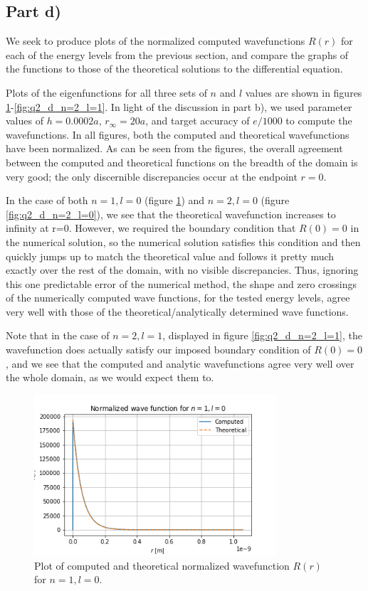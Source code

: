 \documentclass{article}
\begin{document}
\subsection{Part d)}

We seek to produce plots of the normalized computed wavefunctions $R(r)$ for each of the energy levels from the previous section, and compare the graphs of the functions to those of the theoretical solutions to the differential equation.

Plots of the eigenfunctions for all three sets of $n$ and $l$ values are shown in figures \ref{fig:q2_d_n=1_l=0}-\ref{fig:q2_d_n=2_l=1}. In light of the discussion in part b), we used parameter values of $h=0.0002a$, $r_\infty=20a$, and target accuracy of  $e/1000$ to compute the wavefunctions. In all figures, both the computed and theoretical wavefunctions have been normalized. As can be seen from the figures, the overall agreement between the computed and theoretical functions on the breadth of the domain is very good; the only discernible discrepancies occur at the endpoint $r=0$.

In the case of both $n=1, l=0$ (figure \ref{fig:q2_d_n=1_l=0}) and $n=2, l=0$ (figure \ref{fig:q2_d_n=2_l=0}), we see that the theoretical wavefunction increases to infinity at r=0. However, we required the boundary condition that $R(0) = 0$ in the numerical solution, so the numerical solution satisfies this condition and then quickly jumps up to match the theoretical value and follows it pretty much exactly over the rest of the domain, with no visible discrepancies. Thus, ignoring this one predictable error of the numerical method, the shape and zero crossings of the numerically computed wave functions, for the tested energy levels, agree very well with those of the theoretical/analytically determined wave functions.

Note that in the case of $n=2, l=1$, displayed in figure \ref{fig:q2_d_n=2_l=1}, the wavefunction does actually satisfy our imposed boundary condition of $R(0) = 0$, and we see that the computed and analytic wavefunctions agree very well over the whole domain, as we would expect them to.

\begin{figure}[H]
	\centering
	\includegraphics[width=0.8\textwidth]{../images/q2_d_n=1_l=0.png}
	\caption{Plot of computed and theoretical normalized wavefunction $R(r)$ for $n=1, l=0$.}
	\label{fig:q2_d_n=1_l=0}
\end{figure}
\end{document}
